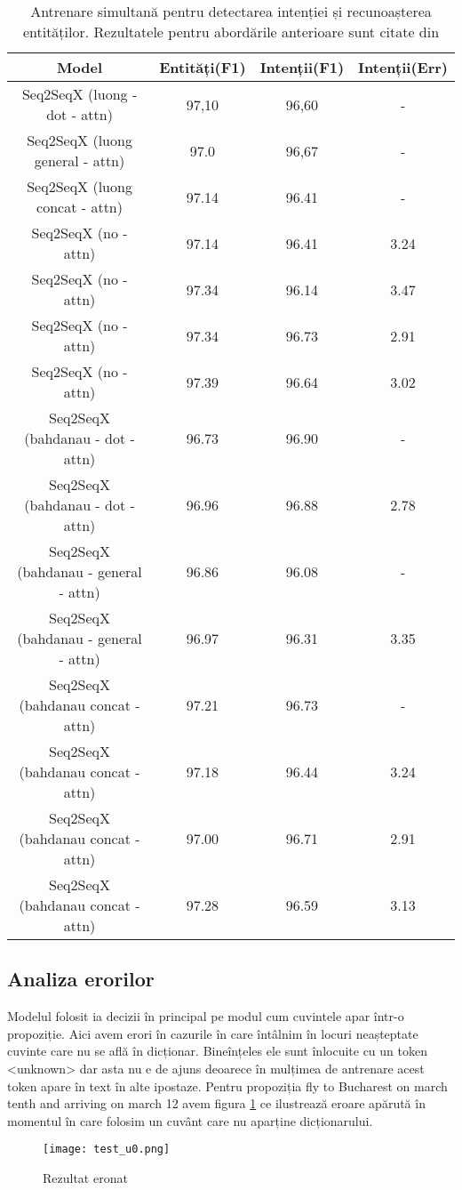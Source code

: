 \bigskip
\begin{table}[htp]
	\small
	\centering
	\begin{tabular}{ c c c c} 
		\hline
		\textbf{Model} 		 & \textbf{Entități(F1)} & \textbf{Intenții(F1)} & \textbf{Intenții(Err)} \\
		\hline
		Seq2SeqX (luong - dot - attn) & 97,10 & 96,60 & - \\ %
		Seq2SeqX (luong general - attn) & 97.0 & 96,67 & - \\ %
		Seq2SeqX (luong concat - attn) & 97.14 & 96.41 & - \\ %
		\hline
		Seq2SeqX (no - attn) & 97.14 & 96.41 & 3.24 \\ %
		Seq2SeqX (no - attn) & 97.34 & 96.14 & 3.47 \\ %
		Seq2SeqX (no - attn) & 97.34 & 96.73 & 2.91 \\ %
		Seq2SeqX (no - attn) & 97.39 & 96.64 & 3.02 \\ %
		\hline
		Seq2SeqX (bahdanau - dot - attn) & 96.73 & 96.90 & - \\ %
		Seq2SeqX (bahdanau - dot - attn) & 96.96 & 96.88 & 2.78 \\ %
		\hline
		Seq2SeqX (bahdanau - general - attn) & 96.86 & 96.08 & - \\ %
		Seq2SeqX (bahdanau - general - attn) & 96.97 & 96.31 & 3.35 \\ %
		\hline
		Seq2SeqX (bahdanau concat - attn) & 97.21 & 96.73 & - \\ %
		Seq2SeqX (bahdanau concat - attn) & 97.18 & 96.44 & 3.24 \\ %
		Seq2SeqX (bahdanau concat - attn) & 97.00 & 96.71 & 2.91 \\ %
		Seq2SeqX (bahdanau concat - attn) & 97.28 & 96.59 & 3.13 \\ %
		
		\hline
	\end{tabular}
	\caption{Antrenare simultană pentru detectarea intenției și recunoașterea entităților. Rezultatele pentru abordările anterioare sunt citate din \cite{att_joint_bing}}
	\label{rezultate2}
\end{table}

\subsection{Analiza erorilor}

Modelul folosit ia decizii în principal pe modul cum cuvintele apar într-o propoziție. Aici avem erori în cazurile în care întâlnim în locuri neașteptate cuvinte care nu se află în dicționar. Bineînțeles ele sunt înlocuite cu un token  <unknown> dar asta nu e de ajuns deoarece în mulțimea de antrenare acest token apare în text în alte ipostaze.
Pentru propoziția {\ttfamily fly to Bucharest on march tenth and arriving on march 12} avem figura \ref{fig:test_u0} ce ilustrează eroare apărută în momentul în care folosim un cuvânt care nu aparține dicționarului.
\begin{figure}[h]
	\centering
	\texttt{[image: test\_u0.png]}
	\caption{Rezultat eronat}
	\label{fig:test_u0}
\end{figure}

